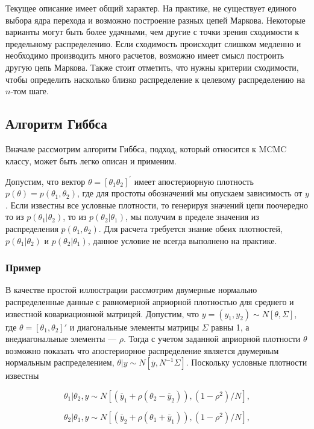 Текущее описание имеет общий характер. На практике, не существует единого выбора ядра перехода и возможно построение разных цепей Маркова. Некоторые варианты могут быть более удачными, чем другие с точки зрения сходимости к предельному распределению. Если сходимость происходит слишком медленно и необходимо производить много расчетов, возможно имеет смысл построить другую цепь Маркова. Также стоит отметить, что нужны критерии сходимости, чтобы определить насколько близко распределение к целевому распределению на $n$-том шаге. 

\subsection{Алгоритм Гиббса}

Вначале рассмотрим алгоритм Гиббса, подход, который относится к MCMC классу, может быть легко описан и применим.

Допустим, что вектор $\theta=[\theta_{1} \theta_2]^{\prime}$ имеет апостериорную плотность $p(\theta)=p(\theta_{1},\theta_{2})$, где для простоты обозначений мы опускаем зависимость от $y$. Если известны все условные плотности, то генерируя  значений цепи поочередно то из $p(\theta_{1}|\theta_{2})$, то  из $p(\theta_{2}|\theta_{1})$,  мы получим в пределе значения из распределения  $p(\theta_{1},\theta_2)$. Для расчета требуется знание обеих плотностей, $p(\theta_{1}{|}\theta_{2})$ и $p(\theta_{2}|\theta_{1})$, данное условие не всегда выполнено на практике.

\subsubsection*{Пример}

В качестве простой иллюстрации рассмотрим двумерные нормально распределенные данные  с равномерной априорной плотностью для среднего и известной ковариационной матрицей. Допустим, что $y=(y_1,y_2){\sim}N[\theta,\Sigma]$, где $\theta=[\theta_{1},\theta_{2}]'$ и диагональные элементы матрицы $\Sigma$ равны 1, а внедиагональные элементы --- $\rho$. Тогда с учетом заданной априорной плотности  $\theta$ возможно показать что апостериорное распределение является двумерным нормальным распределением, $\theta|y{\sim}N[\overline{y},N^{-1}\Sigma]$. Поскольку условные плотности известны


\[
\theta_1|\theta_2, y{\sim}N[(\overline{y}_1+\rho(\theta_2-\overline{y}_2)),(1-\rho^2)/N],
\]

\[
\theta_2|\theta_1, y{\sim}N[(\overline{y}_2+\rho(\theta_1+\overline{y}_1)),(1-\rho^2)/N],
\]

